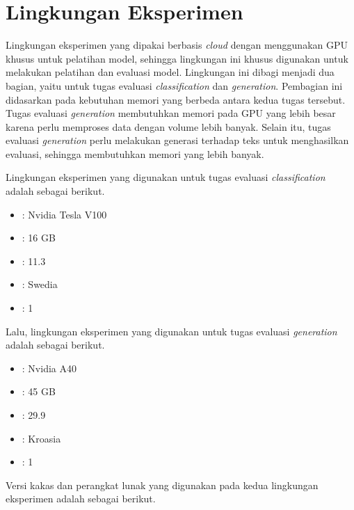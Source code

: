 \section{Lingkungan Eksperimen}
\label{sec:lingkungan-eksperimen}

Lingkungan eksperimen yang dipakai berbasis \textit{cloud} dengan menggunakan GPU khusus untuk pelatihan model, sehingga lingkungan ini khusus digunakan untuk melakukan pelatihan dan evaluasi model. Lingkungan ini dibagi menjadi dua bagian, yaitu untuk tugas evaluasi \textit{classification} dan \textit{generation}. Pembagian ini didasarkan pada kebutuhan memori yang berbeda antara kedua tugas tersebut. Tugas evaluasi \textit{generation} membutuhkan memori pada GPU yang lebih besar karena perlu memproses data dengan volume lebih banyak. Selain itu, tugas evaluasi \textit{generation} perlu melakukan generasi terhadap teks untuk menghasilkan evaluasi, sehingga membutuhkan memori yang lebih banyak.

Lingkungan eksperimen yang digunakan untuk tugas evaluasi \textit{classification} adalah sebagai berikut.

\begin{itemize}
    \item {} : Nvidia Tesla V100
    \item {} : 16 GB
    \item {} : 11.3
    \item {} : Swedia
    \item {} : 1
\end{itemize}

Lalu, lingkungan eksperimen yang digunakan untuk tugas evaluasi \textit{generation} adalah sebagai berikut.

\begin{itemize}
    \item {} : Nvidia A40
    \item {} : 45 GB
    \item {} : 29.9
    \item {} : Kroasia
    \item {} : 1
\end{itemize}

Versi kakas dan perangkat lunak yang digunakan pada kedua lingkungan eksperimen adalah sebagai berikut.

